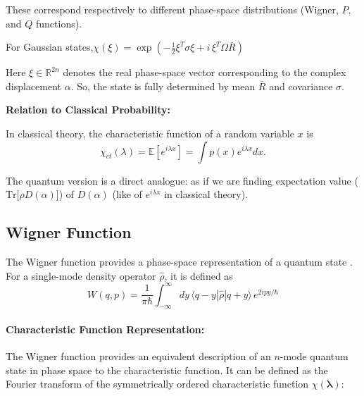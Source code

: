 These correspond respectively to different phase-space distributions (Wigner, $P$, and $Q$ functions).

For Gaussian states,$
\chi(\xi) = \exp\left(
-\frac{1}{2} \xi^T \sigma \xi
+ i \, \xi^T \Omega \bar{R}
\right)$

Here $\xi \in \mathbb{R}^{2n}$ denotes the real phase-space vector corresponding to the complex displacement $\alpha$. So, the state is fully determined by mean $\bar{R}$ and covariance $\sigma$.

\textbf{Relation to Classical Probability:}

In classical theory, the characteristic function of a random variable $x$ is
\begin{equation}
\chi_{ct}(\lambda) = \mathbb{E}[e^{i\lambda x}]
= \int p(x)e^{i\lambda x} dx.
\end{equation}

The quantum version is a direct analogue: as if we are finding expectation value ($\mathrm{Tr}[\rho D(\alpha)$]) of $D(\alpha)$ (like of $e^{i\lambda x}$ in classical theory).



\subsection{Wigner Function}

The Wigner function provides a phase-space representation of a quantum state \cite{weedbrook2012gaussian}. For a single-mode density operator $\hat{\rho}$, it is defined as
\begin{equation}
W(q,p) = \frac{1}{\pi \hbar} \int_{-\infty}^{\infty} dy \,
\langle q - y | \hat{\rho} | q + y \rangle \, e^{2ipy/\hbar}
\end{equation}



\paragraph{Characteristic Function Representation:}
The Wigner function provides an equivalent description of an $n$-mode quantum state in phase space to the characteristic function. It can be defined as the Fourier transform of the symmetrically ordered characteristic function $\chi(\boldsymbol{\lambda})$:

